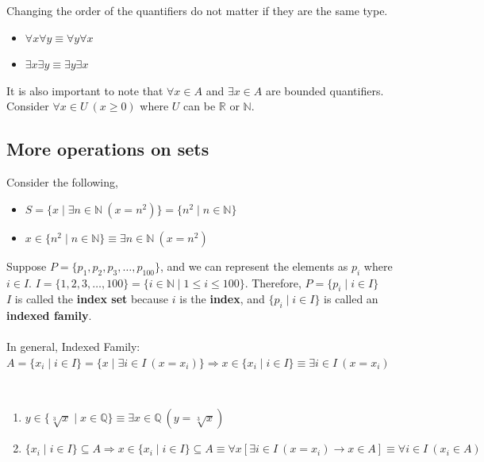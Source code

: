\documentclass[../setup.tex]{subfiles}
\begin{document}
\begin{remark}
Changing the order of the quantifiers do not matter if they are the same type.
\begin{itemize}
	\item $\forall x\forall y \equiv \forall y\forall x$
	\item $\exists x\exists y \equiv \exists y\exists x$
\end{itemize}
It is also important to note that $\forall x \in A$ and $\exists x \in A$ are bounded quantifiers. Consider $\forall x \in U \ (x\geq 0)$ where $U$ can be $\mathbb{R}$ or $\mathbb{N}$.
\end{remark}


\subsection{More operations on sets}
Consider the following, 
\begin{itemize}
	\item $S = \{x \mid \exists n \in \mathbb{N} \ (x = n^2)\} = \{n^2 \mid n \in \mathbb{N}\}$
	\item $x \in \{n^2 \mid n \in \mathbb{N}\} \equiv \exists n \in \mathbb{N} \ (x = n^2)$
\end{itemize}
Suppose $P = \{p_1, p_2, p_3, \dots, p_100\}$, and we can represent the elements as $p_i$ where $i \in I$. $I = \{1, 2, 3, \dots, 100\} = \{i \in \mathbb{N} \mid 1 \leq i \leq 100\}$. Therefore, $P = \{p_i \mid i \in I\}$ \\
$I$ is called the \textbf{index set} because $i$ is the \textbf{index}, and $\{p_i \mid i \in I\}$ is called an \textbf{indexed family}. \\
\\
In general, Indexed Family: $A = \{x_i \mid i \in I\} = \{x \mid \exists i \in I \ (x = x_i)\} \Rightarrow x \in \{x_i \mid i \in I\} \equiv \exists i \in I \ (x = x_i)$ 

\begin{example}
\phantom \\
\begin{enumerate}
	\item $y \in \{\sqrt[3]{x} \mid x \in \mathbb{Q}\} \equiv \exists x \in \mathbb{Q} \ (y=\sqrt[3]{x})$
	\item $\{x_i \mid i \in I\} \subseteq A \Rightarrow x \in \{x_i \mid i \in I\} \subseteq A \equiv \forall x\left[\exists i \in I \ (x = x_i) \rightarrow x \in A \right] \equiv \forall i \in I \ (x_i \in A)$
\end{enumerate}
\end{example}
\end{document}
